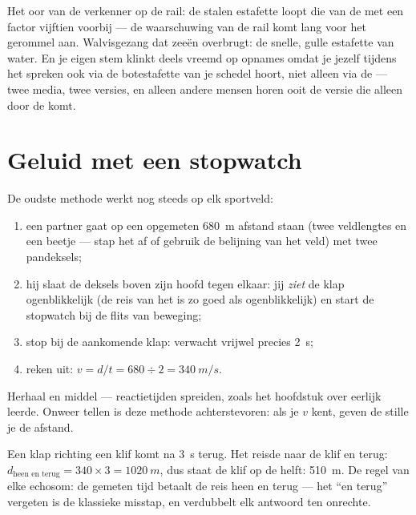 \begin{example}\label{ex:g7:sound-production:scenes}
Het oor van de verkenner op de rail: de stalen estafette loopt die van
de  met een factor vijftien voorbij --- de waarschuwing van de
rail komt lang voor het gerommel aan. Walvisgezang dat zeeën
overbrugt: de snelle, gulle estafette van water. En je eigen stem
klinkt deels vreemd op opnames omdat je jezelf tijdens het spreken
ook via de botestafette van je schedel hoort, niet alleen via de
 --- twee media, twee versies, en alleen andere mensen horen
ooit de versie die alleen door de  komt.
\end{example}

\section{Geluid met een stopwatch}

\begin{method}\label{met:g7:sound-production:measure}
De oudste methode werkt nog steeds op elk sportveld:
\begin{enumerate}
  \item een partner gaat op een opgemeten \qty{680}{m} afstand staan
        (twee veldlengtes en een beetje --- stap het af of gebruik de
        belijning van het veld) met twee pandeksels;
  \item hij slaat de deksels boven zijn hoofd tegen elkaar: jij
        \emph{ziet} de klap ogenblikkelijk (de reis van het
         is zo goed als ogenblikkelijk) en start de
        stopwatch bij de flits van beweging;
  \item stop bij de aankomende klap: verwacht vrijwel precies
        \qty{2}{s};
  \item reken uit: $v = d/t = 680 \div 2 = \qty{340}{m/s}$.
\end{enumerate}
Herhaal en middel --- reactietijden spreiden, zoals het hoofdstuk over
eerlijk  leerde. Onweer tellen is deze methode achterstevoren:
als je $v$ kent, geven de stille  je de afstand.
\end{method}

\begin{example}\label{ex:g7:sound-production:echo}
Een klap richting een klif komt na \qty{3}{s} terug. Het
 reisde naar de klif en terug: $d_{\text{heen en terug}} =
340 \times 3 = \qty{1020}{m}$, dus staat de klif op de helft:
\qty{510}{m}. De regel van elke echosom: de gemeten tijd betaalt de
reis heen en terug --- het ``en terug'' vergeten is de klassieke
misstap, en verdubbelt elk antwoord ten onrechte.
\end{example}

